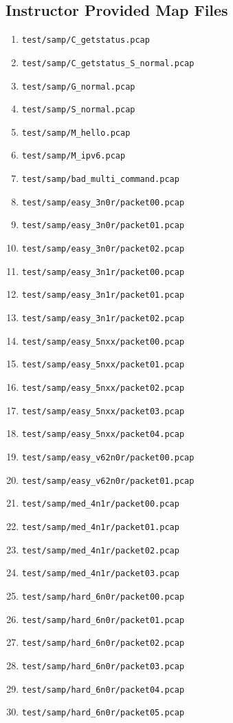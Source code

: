 \documentclass[12pt]{article}
\begin{document}
\subsection{Instructor Provided Map Files}
\begin{enumerate}
    \item \lstinline|test/samp/C_getstatus.pcap|
    \item \lstinline|test/samp/C_getstatus_S_normal.pcap|
    \item \lstinline|test/samp/G_normal.pcap|
    \item \lstinline|test/samp/S_normal.pcap|
    \item \lstinline|test/samp/M_hello.pcap|
    \item \lstinline|test/samp/M_ipv6.pcap|
    \item \lstinline|test/samp/bad_multi_command.pcap|
    \item \lstinline|test/samp/easy_3n0r/packet00.pcap|
    \item \lstinline|test/samp/easy_3n0r/packet01.pcap|
    \item \lstinline|test/samp/easy_3n0r/packet02.pcap|
    \item \lstinline|test/samp/easy_3n1r/packet00.pcap|
    \item \lstinline|test/samp/easy_3n1r/packet01.pcap|
    \item \lstinline|test/samp/easy_3n1r/packet02.pcap|
    \item \lstinline|test/samp/easy_5nxx/packet00.pcap|
    \item \lstinline|test/samp/easy_5nxx/packet01.pcap|
    \item \lstinline|test/samp/easy_5nxx/packet02.pcap|
    \item \lstinline|test/samp/easy_5nxx/packet03.pcap|
    \item \lstinline|test/samp/easy_5nxx/packet04.pcap|
    \item \lstinline|test/samp/easy_v62n0r/packet00.pcap|
    \item \lstinline|test/samp/easy_v62n0r/packet01.pcap|
    \item \lstinline|test/samp/med_4n1r/packet00.pcap|
    \item \lstinline|test/samp/med_4n1r/packet01.pcap|
    \item \lstinline|test/samp/med_4n1r/packet02.pcap|
    \item \lstinline|test/samp/med_4n1r/packet03.pcap|
    \item \lstinline|test/samp/hard_6n0r/packet00.pcap|
    \item \lstinline|test/samp/hard_6n0r/packet01.pcap|
    \item \lstinline|test/samp/hard_6n0r/packet02.pcap|
    \item \lstinline|test/samp/hard_6n0r/packet03.pcap|
    \item \lstinline|test/samp/hard_6n0r/packet04.pcap|
    \item \lstinline|test/samp/hard_6n0r/packet05.pcap|
\end{enumerate}
\end{document}
